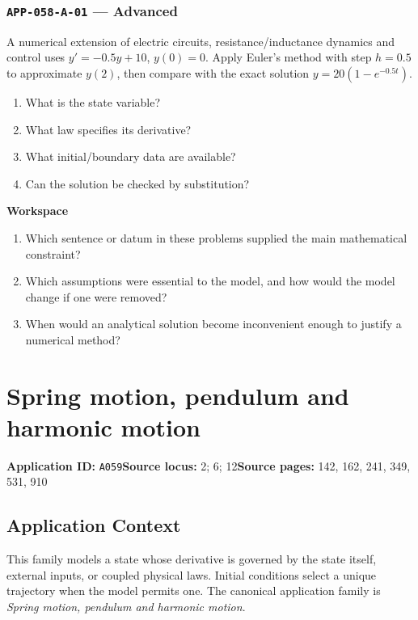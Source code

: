 \documentclass[11pt]{book}
\newcommand{\pid}[1]{\texttt{#1}}
\newcommand{\workspace}{\par\vspace{0.7in}\hrulefill\par\vspace{0.55in}\hrulefill\par}
\begin{document}
\subsection*{\pid{APP-058-A-01} — Advanced}
\begin{problembox}
A numerical extension of electric circuits, resistance/inductance dynamics and control uses $y'=-0.5y+10$, $y(0)=0$. Apply Euler's method with step $h=0.5$ to approximate $y(2)$, then compare with the exact solution $y=20(1-e^{-0.5t})$.
\end{problembox}
\begin{promptbox}\begin{enumerate}
\item What is the state variable?
\item What law specifies its derivative?
\item What initial/boundary data are available?
\item Can the solution be checked by substitution?
\end{enumerate}\end{promptbox}
\textbf{Workspace}\workspace
\begin{reflectionbox}\begin{enumerate}
\item Which sentence or datum in these problems supplied the main mathematical constraint?
\item Which assumptions were essential to the model, and how would the model change if one were removed?
\item When would an analytical solution become inconvenient enough to justify a numerical method?
\end{enumerate}\end{reflectionbox}
\chapter{Spring motion, pendulum and harmonic motion}\label{app:A059}
\textbf{Application ID:} \pid{A059}\quad \textbf{Source locus:} 2; 6; 12\quad \textbf{Source pages:} 142, 162, 241, 349, 531, 910
\section*{Application Context}
This family models a state whose derivative is governed by the state itself, external inputs, or coupled physical laws. Initial conditions select a unique trajectory when the model permits one. The canonical application family is \emph{Spring motion, pendulum and harmonic motion}.
\end{document}
